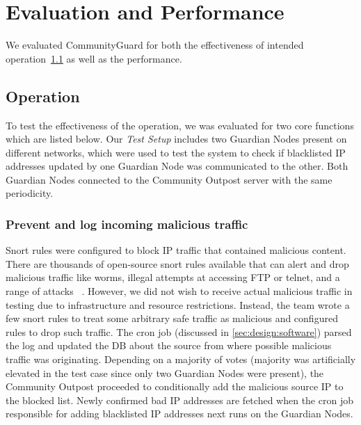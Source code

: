 \section{Evaluation and Performance}
\label{sec:eval}

We evaluated CommunityGuard for both the effectiveness of intended operation~\ref{sec:eval:operation} as well as the performance.  


\subsection{Operation}
\label{sec:eval:operation}

To test the effectiveness of the operation, we was evaluated for two core functions which are listed below.
Our \textit{Test Setup} includes two Guardian Nodes present on different networks, which were used to test the system to check if blacklisted IP addresses updated by one Guardian Node  was communicated to the other. Both Guardian Nodes connected to the Community Outpost server with the same periodicity.

\subsubsection{Prevent and log incoming malicious traffic}
\label{sec:eval:preventout}

 Snort rules were configured to block IP traffic that contained malicious content. There are thousands of open-source snort rules available that can alert and drop malicious traffic like worms, illegal attempts at accessing FTP or telnet, and a range of attacks ~\cite{Roesch:1999:SLI:1039834.1039864}. However, we did not wish to receive actual malicious traffic in testing due to infrastructure and resource restrictions. Instead, the team wrote a few snort rules to treat some arbitrary safe traffic as malicious and configured rules to drop such traffic. 
The cron job (discussed in \ref{sec:design:software}) parsed the log and updated the DB about the source from where possible malicious traffic was originating. Depending on a majority of votes (majority was artificially elevated in the test case since only two Guardian Nodes were present), the Community Outpost proceeded to conditionally add the malicious source IP to the blocked list. Newly confirmed bad IP addresses are fetched when the cron job responsible for adding blacklisted IP addresses next runs on the Guardian Nodes. %

